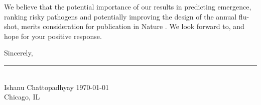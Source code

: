 \documentclass[9pt,onecolumn,compsoc]{IEEEtran}
\newcommand{\Space}{\vspace{10pt}}
\def\JNAME{Proceedings of the National Academy of Sciences \xspace}
\def\JNAME{Nature \xspace}
\begin{document}
We believe that  the potential  importance   of our results in predicting emergence, ranking risky pathogens and potentially improving the design of the annual flu-shot,   merits consideration  for  publication in \JNAME. We look forward to, and  hope for your positive  response.
\Space
\vspace{-14pt}
 
Sincerely,
\vspace{-24pt}

% 
\begin{flushleft}
\vspace{-30pt}

\rule{2.5in}{1pt}\\
{\fontsize{10}{10}\selectfont Ishanu Chattopadhyay}
\hfill \today\\
Chicago, IL
\end{flushleft}

\end{document}
